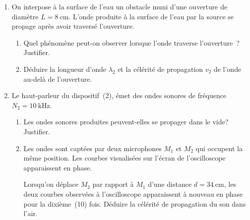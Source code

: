 \begin{enumerate}
\begin{enumerate}
                    L'élongation du point $M$ en fonction de l'élongation de la
                    source $S$ s'écrit~:
                    \begin{table}[H]
                        \flushright
                        \setlength{\arrayrulewidth}{1pt}
                        \renewcommand{\arraystretch}{1.5}
                        \begin{tabularx}{0.95\textwidth}{|p{3mm}|X|p{3mm}|X|p{3mm}|X|p{3mm}|X|}
                            \hline
                            $A$ & $y_{M}(t)=y_{S}(t+0,1)$ &
                            $B$ & $y_{M}(t)=y_{S}(t+0,05)$ &
                            $C$ & $y_{M}(t)=y_{S}(t-0,1)$ &
                            $D$ & $y_{M}(t)=y_{S}(t-0,05)$ \\
                            \hline
                        \end{tabularx}
                    \end{table}
          \end{enumerate}
    \item On interpose à la surface de l'eau un obstacle muni d'une ouverture de
          diamètre $L=\qty{8}{\cm}$. L'onde produite à la surface de l'eau par
          la source se propage après avoir traversé l'ouverture.
          \begin{enumerate}
              \item Quel phénomène peut-on observer lorsque l'onde traverse
                    l'ouverture~? Justifier.
              \item Déduire la longueur d'onde $\lambda_{2}$ et la célérité de
                    propagation $v_{2}$ de l'onde au-delà de l'ouverture.
          \end{enumerate}
    \item Le haut-parleur du dispositif~(2), émet des ondes sonores de fréquence
          $N_{2}=\qty{10}{\kHz}$.
          \begin{enumerate}
              \item Les ondes sonores produites peuvent-elles se propager dans
                    le vide? Justifier.
              \item Les ondes sont captées par deux microphones $M_{1}$
                    et $M_{2}$ qui occupent la même position. Les
                    courbes visualisées sur l'écran de l'oscilloscope
                    apparaissent en phase.
              
                    Lorsqu'on déplace $M_{2}$ par rapport à
                    $M_{1}$ d'une distance $d=\qty{34}{\cm}$, les deux courbes
                    observées à l'oscilloscope apparaissent à nouveau en phase
                    pour la dixième~(10) fois. Déduire la célérité de
                    propagation du son dans l'air.
          \end{enumerate}
\end{enumerate}

